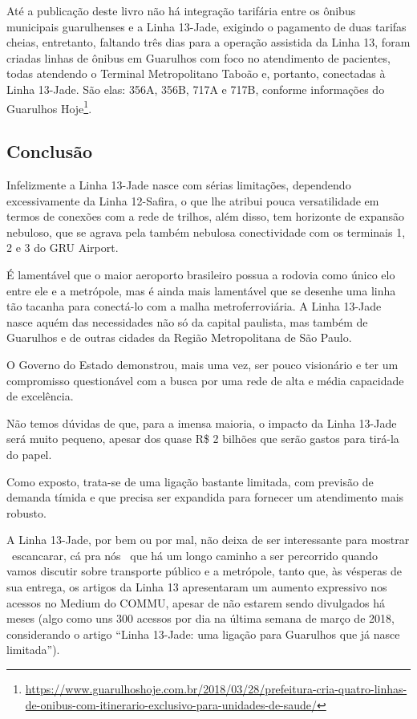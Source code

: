 \documentclass[11pt,fleqn]{book} %
\begin{document}
Até a publicação deste livro não há integração tarifária entre os ônibus municipais guarulhenses e a Linha 13-Jade, exigindo o pagamento de duas tarifas cheias, entretanto, faltando três dias para a operação assistida da Linha 13, foram criadas linhas de ônibus em Guarulhos com foco no atendimento de pacientes, todas atendendo o Terminal Metropolitano Taboão e, portanto, conectadas à Linha 13-Jade. São elas: 356A, 356B, 717A e 717B, conforme informações do Guarulhos Hoje\footnote{\url{https://www.guarulhoshoje.com.br/2018/03/28/prefeitura-cria-quatro-linhas-de-onibus-com-itinerario-exclusivo-para-unidades-de-saude/}}.

\subsection{Conclusão}


Infelizmente a Linha 13-Jade nasce com sérias limitações, dependendo excessivamente da Linha 12-Safira, o que lhe atribui pouca versatilidade em termos de conexões com a rede de trilhos, além disso, tem horizonte de expansão nebuloso, que se agrava pela também nebulosa conectividade com os terminais 1, 2 e 3 do GRU Airport.

É lamentável que o maior aeroporto brasileiro possua a rodovia como único elo entre ele e a metrópole, mas é ainda mais lamentável que se desenhe uma linha tão tacanha para conectá-lo com a malha metroferroviária. A Linha 13-Jade nasce aquém das necessidades não só da capital paulista, mas também de Guarulhos e de outras cidades da Região Metropolitana de São Paulo.

O Governo do Estado demonstrou, mais uma vez, ser pouco visionário e ter um compromisso questionável com a busca por uma rede de alta e média capacidade de excelência.

Não temos dúvidas de que, para a imensa maioria, o impacto da Linha 13-Jade será muito pequeno, apesar dos quase R\$ 2 bilhões que serão gastos para tirá-la do papel.

Como exposto, trata-se de uma ligação bastante limitada, com previsão de demanda tímida e que precisa ser expandida para fornecer um atendimento mais robusto.

A Linha 13-Jade, por bem ou por mal, não deixa de ser interessante para mostrar \textemdash\ escancarar, cá pra nós \textemdash\ que há um longo caminho a ser percorrido quando vamos discutir sobre transporte público e a metrópole, tanto que, às vésperas de sua entrega, os artigos da Linha 13 apresentaram um aumento expressivo nos acessos no Medium do COMMU, apesar de não estarem sendo divulgados há meses (algo como uns 300 acessos por dia na última semana de março de 2018, considerando o artigo ``Linha 13-Jade: uma ligação para Guarulhos que já nasce limitada'').
\end{document}
